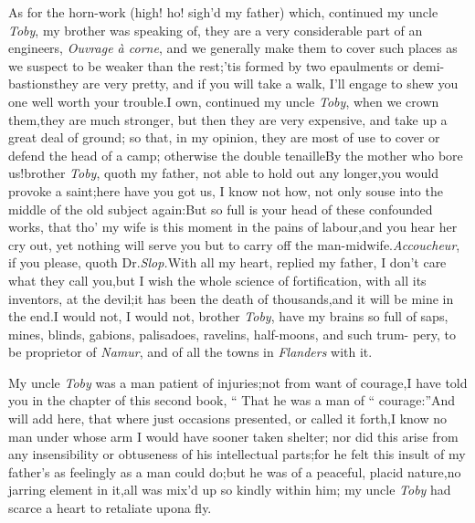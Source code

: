 \documentclass{article}
\begin{document}
\newpage
\tsh As for the horn-work (high! ho! sigh’d my father)
which, continued my uncle \textit{Toby}, my brother was speaking of,
they are a very considerable part of an 
engineers, \textit{Ouvrage à
corne}, and we generally make them to cover such places as we
suspect to be weaker than the rest;\tsk\break ’tis formed by two
epaulments or demi-bastions\tsk they are very pretty, and
if you will take a walk, I’ll engage to shew you one well
worth your trouble.\tsh I own, continued my uncle \textit{Toby},
when we crown them,\tsk they are much stronger, but
then they are very expensive, and take up a great deal of
ground; so that,\break
in my opinion, they are most of use to\break
cover or defend the head of a camp;\break
otherwise the double tenaille\tsh By\break
the mother who bore us!\tsh brother\pb
\textit{Toby}, quoth my father, not able to hold out any
longer,\tsk you would provoke a saint;\tsk here have you
got us, I know not how, not only souse into the middle of
the old subject again:\tsk But so full is your head of these
confounded works, that tho’ my wife is this moment in the
pains of labour,\tsk and you hear her cry out,\tsk\break
yet nothing will serve you but to carry\break
off the man-midwife.\tsh \textit{Accoucheur},\tsk\break
if you please, quoth Dr.\@ \textit{Slop.}\tsk With all 
my heart, replied my father, I don’t care
what they call you,\tsk but I wish the whole
science of fortification, with all its inventors, at the
devil;\tsk it has been the death of thousands,\tsk and it
will be mine in the end.\tsk I would not, I would not,
brother \textit{Toby}, have my brains so full of saps,
mines, blinds, gabions, palisadoes, ravelins, half-moons,
and such trum-\pb 
pery, to be proprietor of \textit{Namur}, and of\break
all the towns in \textit{Flanders} with it.

My uncle \textit{Toby} was a man patient of injuries;\tsk not
from want of courage,\tsk I have told you in the chapter of
this\break
second book, “\kern 2pt That he was a man of\break
“\kern 2pt courage:”\tsk And will add here, that where just
occasions presented, or called it forth,\tsk I know no man
under whose arm I would have sooner taken shelter;\break
nor did this arise from any insensibility or obtuseness of
his intellectual parts;\tsk\break for he felt this insult of my
father’s as feelingly as a man could do;\tsk but he was of a
peaceful, placid nature,\tsk no\break
jarring element in it,\tsk all was mix’d up\break
so kindly within him; my uncle \textit{Toby}\break
had scarce a heart to retaliate upon\break a fly.
\end{document}
